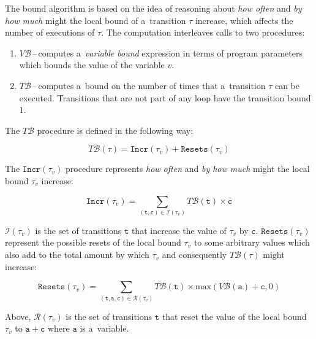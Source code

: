 \documentclass{ExcelAtFIT}
\begin{document}
The bound algorithm is based on the idea of
reasoning about \textit{how often} and
\textit{by how much} might the local bound of
a~transition $\tau$ increase, which affects
the number of executions of $\tau$. The computation
interleaves calls to two procedures:
\vspace{-2.5mm}
\begin{enumerate}
    \item $V\mathcal{B}$\,--\,computes
    a~\textit{variable bound} expression in terms of
    program parameters which bounds the value of the
    variable $v$.

    \item $T\mathcal{B}$\,--\,computes a~bound on the
    number of times that a~transition $\tau$ can be
    executed. Transitions that are not part of any
    loop have the transition bound $1$.
\vspace{-2.5mm}
\end{enumerate}
The $T\mathcal{B}$ procedure is defined in the following
way:
\setlength{\belowdisplayskip}{3pt}
\setlength{\abovedisplayskip}{3pt}
\begin{linenomath}
\begin{equation*}
T\mathcal{B}(\tau) =
\mathtt{Incr}(\tau_v) +
\mathtt{Resets}(\tau_v)
\end{equation*}
\end{linenomath}
The $\mathtt{Incr}(\tau_v)$ procedure
represents \textit{how often}
and \textit{by how much} might the local bound
$\tau_v$ increase:
\begin{linenomath}
\begin{equation*}
\mathtt{Incr}(\tau_v)=
\sum\limits_{(\mathtt{t, c})\in
\mathcal{I}(\tau_v)}
T\mathcal{B}(\mathtt{t})\times\mathtt{c}
\label{eq:incr_procedure}
\end{equation*}
\end{linenomath}
$\mathcal{I}(\tau_v)$ is the set of transitions
$\mathtt{t}$ that increase the value of $\tau_v$
by $\mathtt{c}$. $\mathtt{Resets}(\tau_v)$
represent the possible resets of the local bound
$\tau_v$ to some arbitrary values which also add
to the total amount by which $\tau_v$ and
consequently $T\mathcal{B}(\tau)$ might increase:
\begin{linenomath}
\begin{equation*}
\mathtt{Resets}(\tau_v)=
\sum\limits_{(\mathtt{t, a, c})\in
\mathcal{R}(\tau_v)}
T\mathcal{B}(\mathtt{t})\times
\mathrm{max}(V\mathcal{B}(\mathtt{a}) + \mathtt{c}, 0)
\label{eq:resets_procedure}
\end{equation*}
\end{linenomath}
Above, $\mathcal{R}(\tau_v)$ is the set of transitions
$\mathtt{t}$ that reset the value of the local bound
$\tau_v$ to $\mathtt{a} + \mathtt{c}$ where $\mathtt{a}$
is a~variable.
\end{document}
